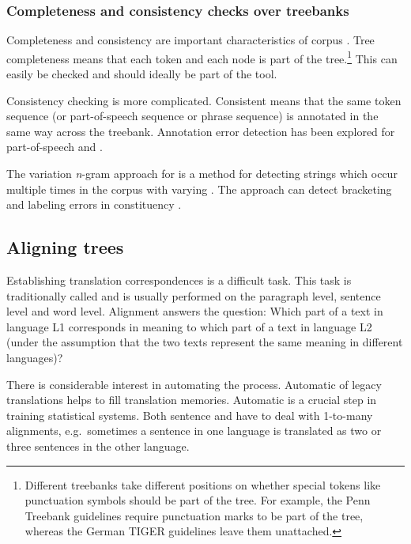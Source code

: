\documentclass[output=paper]{LSP/langsci}
\begin{document}
\subsubsection{Completeness and consistency checks over treebanks}\label{sec:volk:2.1.2}

Completeness and consistency are important characteristics of corpus . Tree completeness means that each token and each node is part of the tree.\footnote{Different treebanks take different positions on whether special tokens like punctuation symbols should be part of the tree. For example, the Penn Treebank guidelines require punctuation marks to be part of the tree, whereas the German TIGER guidelines leave them unattached.} This can easily be checked and should ideally be part of the  tool. 

Consistency checking is more complicated. Consistent  means that the same token sequence (or part-of-speech sequence or phrase sequence) is annotated in the same way across the treebank. Annotation error detection has been explored for part-of-speech  \citep{Dickinson2003a,Loftsson2009} and  \citep{Ule2004,Dickinson2005}. 

The variation \textit{n}{}-gram approach for  \citep{Dickinson2003b, Dickinson2005} is a method for detecting strings which occur multiple times in the corpus with varying . The approach can detect bracketing and labeling errors in constituency . 

\subsection{Aligning trees}\label{sec:volk:2.2}
 \largerpage
Establishing translation correspondences is a difficult task. This task is traditionally called  and is usually performed on the paragraph level, sentence level and word level. Alignment answers the question: Which part of a text in language L1 corresponds in meaning to which part of a text in language L2 (under the assumption that the two texts represent the same meaning in different languages)? 

There is considerable interest in automating the  process. Automatic  of legacy translations helps to fill translation memories. Automatic  is a crucial step in training statistical  systems. Both sentence and  have to deal with 1-to-many alignments, e.g.~sometimes a sentence in one language is translated as two or three sentences in the other language. 
\end{document}
